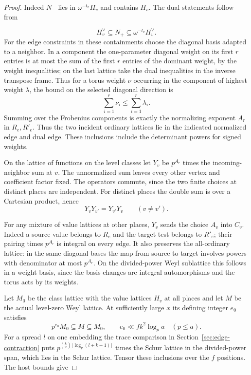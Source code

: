 \begin{proof}

Indeed \(N_-\) lies in \(\omega^{-t_v}H_v\) and contains \(H_v\).
The dual statements follow from

\[
  H_v^\vee\subseteq N_+\subseteq\omega^{-t_v}H_v^\vee.
\]
For the edge constraints in these containments choose the diagonal
basis adapted to a neighbor. In a component the one-parameter
diagonal weight on its first \(r\) entries is at most the sum of
the first \(r\) entries of the dominant weight, by the weight
inequalities; on the last lattice take the dual inequalities in
the inverse transpose frame.
Thus for a torus weight \(\nu\) occurring in the component of highest weight \(\lambda\), the bound on the selected diagonal direction is
\[
  \sum_{i=1}^r\nu_i\le\sum_{i=1}^r\lambda_i .
\]
 Summing over the Frobenius components
is exactly the normalizing exponent \(A_r\) in \(R_e,R'_e\).
Thus the two incident ordinary lattices lie in the indicated
normalized edge and dual edge. These inclusions include the
determinant powers for signed weights.


On the lattice of functions on the level classes let \(Y_v\) be
\(p^{A_r}\) times the incoming-neighbor sum at \(v\). The unnormalized
sum leaves every other vertex and coefficient factor fixed.
The operators commute, since the two finite choices at distinct
places are independent.
For distinct places the double sum is over a Cartesian product, hence
\[
  Y_vY_{v'}=Y_{v'}Y_v\qquad(v\ne v').
\]

For any mixture of value lattices at other
places, \(Y_v\) sends the choice \(A_v\) into \(C_v\). Indeed a source
value belongs to \(R_e\) and the target test belongs to \(R'_e\);
their pairing times \(p^{A_r}\) is integral on every edge.
It also preserves the all-ordinary lattice: in the same diagonal
bases the map from source to target involves powers with denominator
at most \(p^{A_r}\). On the divided-power Weyl sublattice this
follows in a weight basis, since the basis changes are integral
automorphisms and the torus acts by its weights.


Let \(M_0\) be the class lattice with the value lattices \(H_v\) at
all places and let \(M\) be the actual level-zero Weyl lattice.
At sufficiently large \(x\) its defining integer \(e_0\) satisfies
\[
 p^{e_0}M_0\subseteq M\subseteq M_0,\qquad
      e_0\ll f k^2\log_p a\quad (p\le a).
 \tag{C2}\label{eq:tag-c2}
\]
For a spread \(l\) on one embedding the trace comparison in
Section~\ref{sec:edge-contraction} puts \(p^{\binom k2
\lfloor\log_p(l+k-1)\rfloor}\) times the Schur lattice in the
divided-power span, which lies in the Schur lattice. Tensor these
inclusions over the \(f\) positions. The host bounds give


\end{proof}
